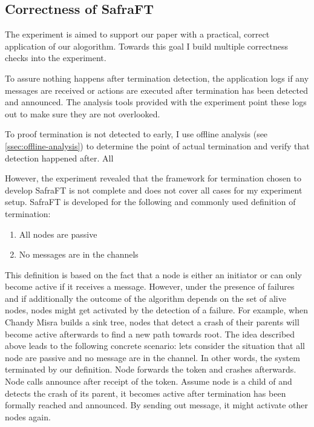 \subsection{Correctness of SafraFT}
\label{ssec:correctness}
The experiment is aimed to support our paper with a practical, correct application of our alogorithm.
Towards this goal I build multiple correctness checks into the experiment. 

To assure nothing happens after termination detection, the application logs if any messages are received or actions are executed after termination has been detected and announced. 
The analysis tools provided with the experiment point these logs out to make sure they are not overlooked.

To proof termination is not detected to early, I use offline analysis (see \cref{ssec:offline-analysis}) to determine the point of actual termination and verify that detection happened after.
All %

However, the experiment revealed that the framework for termination chosen to develop SafraFT is not complete and does not cover all cases for my experiment setup.
SafraFT is developed for the following and commonly used definition of termination:
\begin{enumerate}
	\item All nodes are passive
	\item No messages are in the channels
\end{enumerate}
This definition is based on the fact that a node is either an initiator or can only become active if it receives a message. 
However, under the presence of failures and if additionally the outcome of the algorithm depends on the set of alive nodes, nodes might get activated by the detection of a failure.
For example, when Chandy Misra builds a sink tree, nodes that detect a crash of their parents will become active afterwards to find a new path towards root.
The idea described above leads to the following concrete scenario: lets consider the situation that all node are passive and no message are in the channel. 
In other words, the system terminated by our definition.
Node  forwards the token and crashes afterwards. 
Node  calls announce after receipt of the token.
Assume node  is a child of  and detects the crash of its parent, it becomes active after termination has been formally reached and announced.
By sending out  message, it might activate other nodes again.

